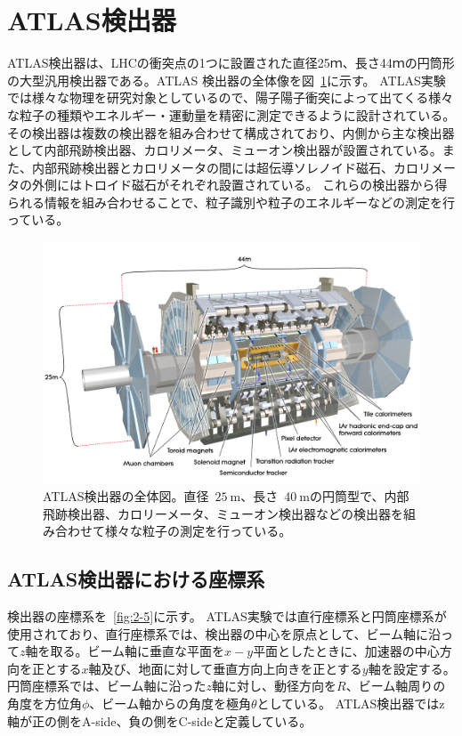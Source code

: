 \section{ATLAS検出器}\label{section2-2}

ATLAS検出器は、LHCの衝突点の1つに設置された直径25ｍ、長さ44ｍの円筒形の大型汎用検出器である\cite{Aad:1129811}。ATLAS 検出器の全体像を図~\ref{fig:2-4}に示す。
ATLAS実験では様々な物理を研究対象としているので、陽子陽子衝突によって出てくる様々な粒子の種類やエネルギー・運動量を精密に測定できるように設計されている。
その検出器は複数の検出器を組み合わせて構成されており、内側から主な検出器として内部飛跡検出器、カロリメータ、ミューオン検出器が設置されている。また、内部飛跡検出器とカロリメータの間には超伝導ソレノイド磁石、カロリメータの外側にはトロイド磁石がそれぞれ設置されている。
これらの検出器から得られる情報を組み合わせることで、粒子識別や粒子のエネルギーなどの測定を行っている。

\begin{figure}[tb]
  \centering
  \includegraphics[clip,width=12cm]{fig/2/0803012_01.jpg}
  \caption{ATLAS検出器の全体図\cite{Aad:1129811}。直径~$\SI{25}{\m}$、長さ~$\SI{40}{\m}$の円筒型で、内部飛跡検出器、カロリーメータ、ミューオン検出器などの検出器を組み合わせて様々な粒子の測定を行っている。}
  \label{fig:2-4}
\end{figure}

\subsection{ATLAS検出器における座標系}\label{section2-2-1}
検出器の座標系を~\ref{fig:2-5}に示す。
ATLAS実験では直行座標系と円筒座標系が使用されており、直行座標系では、検出器の中心を原点として、ビーム軸に沿って$z$軸を取る。ビーム軸に垂直な平面を$x-y$平面としたときに、加速器の中心方向を正とする$x$軸及び、地面に対して垂直方向上向きを正とする$y$軸を設定する。円筒座標系では、ビーム軸に沿った$z$軸に対し、動径方向を$R$、ビーム軸周りの角度を方位角$\phi$、ビーム軸からの角度を極角$\theta$としている。
ATLAS検出器ではz軸が正の側をA-side、負の側をC-sideと定義している。

